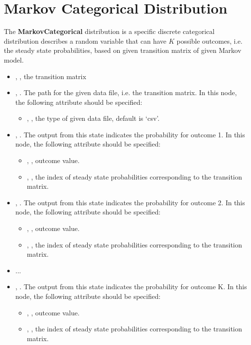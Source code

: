 \section{Markov Categorical Distribution}
\label{sec:markovCategorical}

The \textbf{MarkovCategorical} distribution is a specific discrete categorical distribution describes
a random variable that can have $K$ possible outcomes, i.e. the steady state probabilities, based on given
transition matrix of given Markov model.
%
\begin{itemize}
  \item {}, , the transition matrix
  \item {}, . The path for the given data file, i.e. the transition matrix.
    In this node, the following attribute should be specified: 
    \begin{itemize}
      \item {}, , the type of given data file, default is `csv'.
    \end{itemize}
  \item {}, . The output from this state indicates
    the probability for outcome 1.
    In this node, the following attribute should be specified:
    \begin{itemize}
      \item {}, , outcome value. 
      \item {}, , the index of steady state probabilities corresponding to the transition matrix. 
    \end{itemize}
  \item {}, . The output from this state indicates
    the probability for outcome 2.
    In this node, the following attribute should be specified:
    \begin{itemize}
      \item {}, , outcome value. 
      \item {}, , the index of steady state probabilities corresponding to the transition matrix. 
    \end{itemize}
  \item ...
  \item {}, . The output from this state indicates
    the probability for outcome K.
    In this node, the following attribute should be specified:
    \begin{itemize}
      \item {}, , outcome value. 
      \item {}, , the index of steady state probabilities corresponding to the transition matrix. 
    \end{itemize}

\end{itemize}

